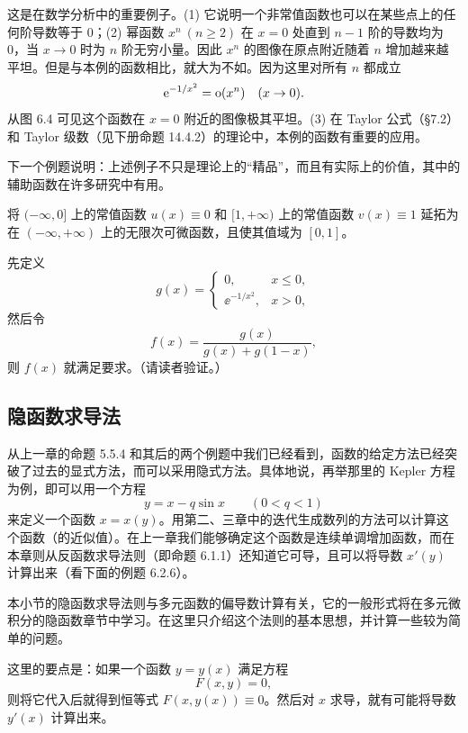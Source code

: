 \begin{xremark}
这是在数学分析中的重要例子。(1) 它说明一个非常值函数也可以在某些点上的任何阶导数等于 0；(2) 幂函数 $x^n\ (n\ge2)$ 在 $x=0$ 处直到 $n-1$ 阶的导数均为 0，当 $x\to0$ 时为 $n$ 阶无穷小量。因此 $x^n$ 的图像在原点附近随着 $n$ 增加越来越平坦。但是与本例的函数相比，就大为不如。因为这里对所有 $n$ 都成立
\[
  \mathrm{e}^{-1/x^2}=\mathrm{o}(x^n)\quad(x\to0).
\]
从图 6.4 可见这个函数在 $x=0$ 附近的图像极其平坦。(3) 在 Taylor 公式（§7.2）和 Taylor 级数（见下册命题 14.4.2）的理论中，本例的函数有重要的应用。

下一个例题说明：上述例子不只是理论上的“精品”，而且有实际上的价值，其中的辅助函数在许多研究中有用。
\end{xremark}

\begin{xexample}[6.2.5]
将 $(-\infty,0]$ 上的常值函数 $u(x)\equiv0$ 和 $[1,+\infty)$ 上的常值函数 $v(x)\equiv1$ 延拓为在 $(-\infty,+\infty)$ 上的无限次可微函数，且使其值域为 $[0,1]$。
\end{xexample}
\begin{xsolution}
先定义
\[
  g(x)=
  \begin{cases}
    0, & x\le0,\\
    \ee^{-1/x^2}, & x>0,
  \end{cases}
\]
然后令
\[
  f(x)=\frac{g(x)}{g(x)+g(1-x)},
\]
则 $f(x)$ 就满足要求。（请读者验证。）
\end{xsolution}

\subsection{隐函数求导法}

从上一章的命题 5.5.4 和其后的两个例题中我们已经看到，函数的给定方法已经突破了过去的显式方法，而可以采用隐式方法。具体地说，再举那里的 Kepler 方程为例，即可以用一个方程
\[
  y=x-q\sin x\qquad(0<q<1)
\]
来定义一个函数 $x=x(y)$。用第二、三章中的迭代生成数列的方法可以计算这个函数（的近似值）。在上一章我们能够确定这个函数是连续单调增加函数，而在本章则从反函数求导法则（即命题 6.1.1）还知道它可导，且可以将导数 $x'(y)$ 计算出来（看下面的例题 6.2.6）。

本小节的隐函数求导法则与多元函数的偏导数计算有关，它的一般形式将在多元微积分的隐函数章节中学习。在这里只介绍这个法则的基本思想，并计算一些较为简单的问题。

这里的要点是：如果一个函数 $y=y(x)$ 满足方程
\[
  F(x,y)=0,
\]
则将它代入后就得到恒等式 $F(x,y(x))\equiv0$。然后对 $x$ 求导，就有可能将导数 $y'(x)$ 计算出来。

